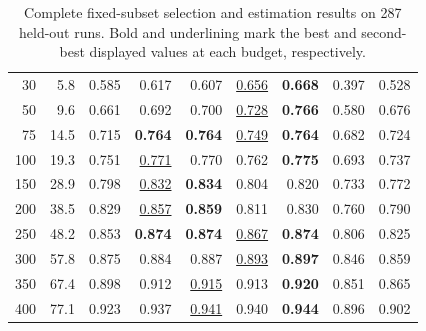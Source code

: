 \begin{table}[t]
\begin{tabular}{rrrrrrrrr}
    30 & 5.8 & 0.585 & 0.617 & 0.607 & \underline{0.656} & \textbf{0.668} & 0.397 & 0.528 \\
    50 & 9.6 & 0.661 & 0.692 & 0.700 & \underline{0.728} & \textbf{0.766} & 0.580 & 0.676 \\
    75 & 14.5 & 0.715 & \textbf{0.764} & \textbf{0.764} & \underline{0.749} & \textbf{0.764} & 0.682 & 0.724 \\
    100 & 19.3 & 0.751 & \underline{0.771} & 0.770 & 0.762 & \textbf{0.775} & 0.693 & 0.737 \\
    150 & 28.9 & 0.798 & \underline{0.832} & \textbf{0.834} & 0.804 & 0.820 & 0.733 & 0.772 \\
    200 & 38.5 & 0.829 & \underline{0.857} & \textbf{0.859} & 0.811 & 0.830 & 0.760 & 0.790 \\
    250 & 48.2 & 0.853 & \textbf{0.874} & \textbf{0.874} & \underline{0.867} & \textbf{0.874} & 0.806 & 0.825 \\
    300 & 57.8 & 0.875 & 0.884 & 0.887 & \underline{0.893} & \textbf{0.897} & 0.846 & 0.859 \\
    350 & 67.4 & 0.898 & 0.912 & \underline{0.915} & 0.913 & \textbf{0.920} & 0.851 & 0.865 \\
    400 & 77.1 & 0.923 & 0.937 & \underline{0.941} & 0.940 & \textbf{0.944} & 0.896 & 0.902 \\
    \bottomrule
  \end{tabular}
  \caption{Complete fixed-subset selection and estimation results on 287 held-out runs. Bold and underlining mark the best and second-best displayed values at each budget, respectively.}
  \label{tab:fixed-design-complete}
\end{table}
